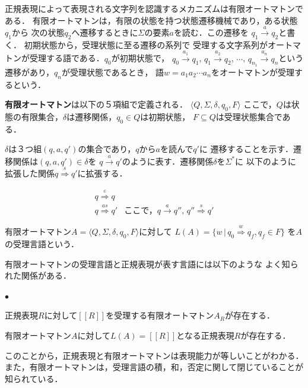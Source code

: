 \documentclass[a4j,dvipdfmx]{jbook}
\begin{document}
正規表現によって表現される文字列を認識するメカニズムは有限オートマトンである．
有限オートマトンは，有限の状態を持つ状態遷移機械であり，ある状態$q_1$から
次の状態$q_2$へ遷移するときに$\Sigma$の要素$a$を読む．この遷移を
$q_1\xrightarrow{a}q_2$と書く．
初期状態から，受理状態に至る遷移の系列で
受理する文字系列がオートマトンが受理する語である．$q_0$が初期状態で，
$q_0\xrightarrow{a_1}q_1$, $q_1\xrightarrow{a_2}q_2$, $\cdots$,
$q_{n_1}\xrightarrow{a_n}q_n$という遷移があり，$q_n$が受理状態であるとき，
語$w=a_1a_2\cdots a_n$をオートマトンが受理するという．

\begin{Def}
  {\bf 有限オートマトン}は以下の５項組で定義される．
  $\langle Q,\Sigma,\delta,q_0,F\rangle$
  ここで，$Q$は状態の有限集合，$\delta$は遷移関係，$q_0\in Q$は初期状態，
  $F\subseteq Q$は受理状態集合である．
\end{Def}

  $\delta$は３つ組$(q,a,q')$の集合であり，$q$から$a$を読んで$q'$に
  遷移することを示す．遷移関係は$(q,a,q')\in\delta$を
  $q\xrightarrow{a}q'$のように表す．遷移関係$\delta$を$\Sigma^\ast$に
  以下のように拡張した関係$q\stackrel{s}{\Rightarrow}q'$に拡張する．

  \[\begin{array}{ll}
    q\stackrel{\varepsilon}{\Rightarrow}q & \\
    q\stackrel{as}{\Rightarrow}q' & \mbox{ここで，$q\xrightarrow{a}q''$,
    $q''\stackrel{s}{\Rightarrow}q'$}
  \end{array}\]

  \begin{Def}
    有限オートマトン$A=\langle Q,\Sigma,\delta,q_0,F\rangle$に対して
    $L(A)=\{w\,|\,q_0\stackrel{w}{\Rightarrow}q_f, q_f\in F\}$
    を$A$の受理言語という．
  \end{Def}

  有限オートマトンの受理言語と正規表現が表す言語には以下のような
  よく知られた関係がある．

  \begin{Thm}
    \begin{list}{$\bullet$}{}
    \item 正規表現$R$に対して$[\![R]\!]$を受理する有限オートマトン$A_R$が存在する．
    \item 有限オートマトン$A$に対して$L(A)=[\![R]\!]$となる正規表現$R$が存在する．
    \end{list}
  \end{Thm}

  このことから，正規表現と有限オートマトンは表現能力が等しいことがわかる．
  また，有限オートマトンは，受理言語の積，和，否定に関して閉じていることが知られている．
\end{document}
